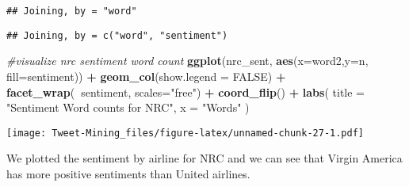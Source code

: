 \documentclass[
]{article}
\newenvironment{Shaded}{\begin{snugshade}}{\end{snugshade}}
\newcommand{\CommentTok}[1]{\textcolor[rgb]{0.56,0.35,0.01}{\textit{#1}}}
\newcommand{\DataTypeTok}[1]{\textcolor[rgb]{0.13,0.29,0.53}{#1}}
\newcommand{\DecValTok}[1]{\textcolor[rgb]{0.00,0.00,0.81}{#1}}
\newcommand{\KeywordTok}[1]{\textcolor[rgb]{0.13,0.29,0.53}{\textbf{#1}}}
\newcommand{\NormalTok}[1]{#1}
\newcommand{\OperatorTok}[1]{\textcolor[rgb]{0.81,0.36,0.00}{\textbf{#1}}}
\newcommand{\OtherTok}[1]{\textcolor[rgb]{0.56,0.35,0.01}{#1}}
\newcommand{\StringTok}[1]{\textcolor[rgb]{0.31,0.60,0.02}{#1}}
\begin{document}
\begin{verbatim}
## Joining, by = "word"
\end{verbatim}

\begin{Shaded}
\end{Shaded}

\begin{verbatim}
## Joining, by = c("word", "sentiment")
\end{verbatim}

\begin{Shaded}
\begin{Highlighting}[]
 \CommentTok{#visualize nrc sentiment word count}
    \KeywordTok{ggplot}\NormalTok{(nrc_sent, }\KeywordTok{aes}\NormalTok{(}\DataTypeTok{x=}\NormalTok{word2,}\DataTypeTok{y=}\NormalTok{n, }\DataTypeTok{fill=}\NormalTok{sentiment)) }\OperatorTok{+}
\StringTok{    }\KeywordTok{geom_col}\NormalTok{(}\DataTypeTok{show.legend =} \OtherTok{FALSE}\NormalTok{) }\OperatorTok{+}
\StringTok{    }\KeywordTok{facet_wrap}\NormalTok{(}\OperatorTok{~}\NormalTok{sentiment, }\DataTypeTok{scales=}\StringTok{"free"}\NormalTok{) }\OperatorTok{+}
\StringTok{    }\KeywordTok{coord_flip}\NormalTok{() }\OperatorTok{+}\StringTok{ }
\StringTok{    }\KeywordTok{labs}\NormalTok{(}
      \DataTypeTok{title =} \StringTok{"Sentiment Word counts for NRC"}\NormalTok{,}
      \DataTypeTok{x =} \StringTok{"Words"}
\NormalTok{    )}
\end{Highlighting}
\end{Shaded}

\texttt{[image: Tweet-Mining\_files/figure-latex/unnamed-chunk-27-1.pdf]}

We plotted the sentiment by airline for NRC and we can see that Virgin
America has more positive sentiments than United airlines.
\end{document}
